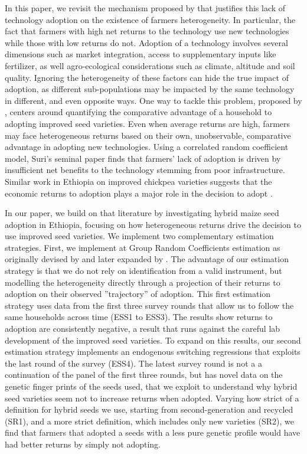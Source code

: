 \documentclass{article}
\begin{document}

In this paper, we revisit the mechanism proposed by  \citep{Suri2011-oi} that justifies this lack of technology adoption on the existence of farmers heterogeneity. In particular, the fact that farmers with high net returns to the technology use new technologies while those with low returns do not. Adoption of a technology involves several dimensions such as market integration, access to supplementary inputs like fertilizer, as well agro-ecological considerations such as climate, altitude and soil quality. Ignoring the heterogeneity of these factors can hide the true impact of adoption, as different sub-populations may be impacted by the same technology in different, and even opposite ways. One way to tackle this problem, proposed by \citep{Suri2011-oi}, centers around quantifying the comparative advantage of a household to adopting improved seed varieties. Even when average returns are high, farmers may face heterogeneous returns based on their own, unobservable, comparative advantage in adopting new technologies. Using a correlated random coefficient model, Suri’s seminal paper finds that farmers’ lack of adoption is driven by insufficient net benefits to the technology stemming from poor infrastructure. Similar work in Ethiopia on improved chickpea varieties suggests that the economic returns to adoption plays a major role in the decision to adopt \citep{Michler2018-wk}.

In our paper, we build on that literature by investigating hybrid maize seed adoption in Ethiopia, focusing on how heterogeneous returns drive the decision to use improved seed varieties. We implement two complementary estimation strategies. First, we implement at Group Random Coefficients estimation as originally devised by \cite{Suri2011-oi} and later expanded by \citep{Tjernstrom_Emilia_Dalia_Ghanem_Oscar_Barriga_Cabanillas_Travis_J_Lybbert_Jeffrey_D_Michler_and_Aleksandr_Michuda2020-bc}. The advantage of our estimation strategy is that we do not rely on identification from a valid instrument,
but modelling the heterogeneity directly through a projection of their returns to adoption on their observed
”trajectory” of adoption. This first estimation strategy uses data from the first three survey rounds that allow us to follow the same households across time (ESS1 to ESS3). The results show returns to adoption are consistently negative, a result that runs against the careful lab development of the improved seed varieties. To expand on this results, our second estimation strategy implements an endogenous switching regressions that exploits the last round of the survey (ESS4). The latest survey round is not a a continuation of the panel of the first three rounds, but has novel data on the genetic finger prints of the seeds used, that we exploit to understand why hybrid seed varieties seem not to increase returns when adopted. Varying how strict of a definition for hybrid seeds we use, starting from second-generation and recycled (SR1), and a more strict definition, which includes only new varieties (SR2), we find that  farmers that adopted a seeds with a less pure genetic profile would have had better returns by simply not adopting. 
\end{document}
